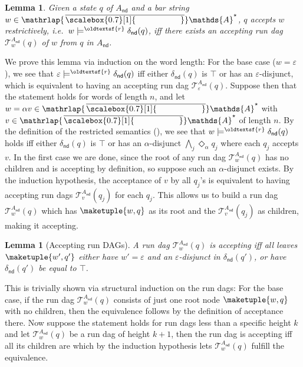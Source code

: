 \documentclass[10pt,a4paper]{amsart}
\newtheorem{lem}[theo]{Lemma}
\theoremstyle{definition}
\renewcommand{\textsf}[1]{{\oldtextsf{\small#1}}}
\newcommand{\At}{\mathds{A}}
\newcommand{\barAs}{\barNames^{\star}}
\newcommand{\op}[1]{\operatorname{\mathsf{#1}}}
\newcommand{\nd}{\op{nd}}
\newcommand{\runtree}[3]{\mathcal{T}_{#1}^{#2}(#3)}
\newcommand{\rsem}{\vDash^{\textsf{r}}}
\newcommand{\names}{\At}
\newcommand{\mybar}[3]{%
  \mathrlap{\hspace{#2}\overline{\scalebox{#1}[1]{\phantom{\ensuremath{#3}}}}}\ensuremath{#3}
}
\newcommand{\barNames}{{\mybar{0.7}{1.25pt}{\names}}}
\renewcommand{\vDash}{\models}
\begin{document}
\begin{lem}
  Given a state $q$ of $A_{\nd}$ and a bar string $w \in \barAs$, $q$ accepts $w$ restrictively, i.e.~$w \rsem \delta_{\nd}(q)$, iff there exists an accepting run dag  $\runtree{w}{A_{\nd}}{q}$ of $w$ from $q$ in $A_{\nd}$.
\end{lem}
\begin{IEEEproof}
  We prove this lemma via induction on the word length: For the base case ($w = \varepsilon$), we see
  that $\varepsilon \rsem \delta_{\nd}(q)$ iff either $\delta_{\nd}(q)$ is $\top$ or has an
  $\varepsilon$-disjunct, which is equivalent to having an accepting run dag $\runtree{\varepsilon}{A_{\nd}}{q}$.
  Suppose then that the statement holds for words of length $n$, and
  let $w = \alpha v \in \barAs$ with $v \in \barAs$ of length $n$. By the definition of the restricted
  semantics (), we see that $w \rsem \delta_{\nd}(q)$ holds iff either $\delta_{\nd}(q)$
  is $\top$ or has an $\alpha$-disjunct $\bigwedge_{j} \Diamond_\alpha q_j$ where each $q_j$ accepts $v$. In
  the first case we are done, since the root of any run dag $\runtree{w}{A_{\nd}}{q}$ has no children and
  is accepting by definition, so suppose such an $\alpha$-disjunct exists. By the induction hypothesis,
  the acceptance of $v$ by all $q_j$'s is equivalent to having accepting run dags $\runtree{v}{A_{\nd}}{q_j}$
  for each $q_j$. This allows us to build a run dag $\runtree{w}{A_{\nd}}{q}$ which has $\maketuple{w, q}$ as
  its root and the $\runtree{v}{A_{\nd}}{q_j}$ as children, making it accepting.
\end{IEEEproof}

\begin{lem}[Accepting run DAGs]\label{lem:accruntree}%
  A run dag $\runtree{w}{A_{\nd}}{q}$ is accepting iff all leaves $\maketuple{w',q'}$
  either have $w' = \varepsilon$ and an $\varepsilon$-disjunct in $\delta_{\nd}(q')$,
  or have $\delta_{\nd}(q')$ be equal to $\top$.
\end{lem}
\begin{IEEEproof}
  This is trivially shown via structural induction on the run dags: For the base case,
  if the run dag $\runtree{w}{A_{\nd}}{q}$ consists of just one root node $\maketuple{w, q}$
  with no children, then the equivalence follows by the definition of acceptance there.
  Now suppose the statement holds for run dags less than a specific height $k$ and
  let $\runtree{w}{A_{\nd}}{q}$ be a run dag of height $k + 1$, then the run dag is
  accepting iff all its children are which by the induction hypothesis lets $\runtree{w}{A_{\nd}}{q}$
  fulfill the equivalence.
\end{IEEEproof}
\end{document}
